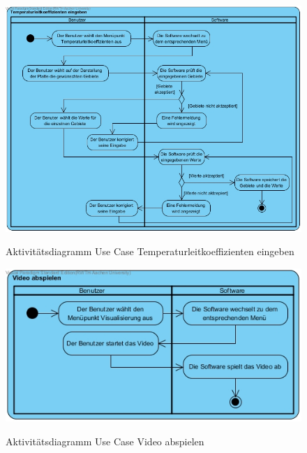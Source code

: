 \begin{figure}[H]
	\centering
	\includegraphics[scale=.5]{Bilder/Temperaturleitkoeffizienten_eingeben.jpg}\\
	\caption{Aktivitätsdiagramm Use Case Temperaturleitkoeffizienten eingeben}
	\label{Aktivitätsdiagramm Use Case Temperaturleitkoeffizienten eingeben}
\end{figure}

\begin{figure}[H]
	\centering
	\includegraphics[scale=.5]{Bilder/Video_abspielen.jpg}\\
	\caption{Aktivitätsdiagramm Use Case Video abspielen}
	\label{Aktivitätsdiagramm Use Case Video abspielen}
\end{figure}

